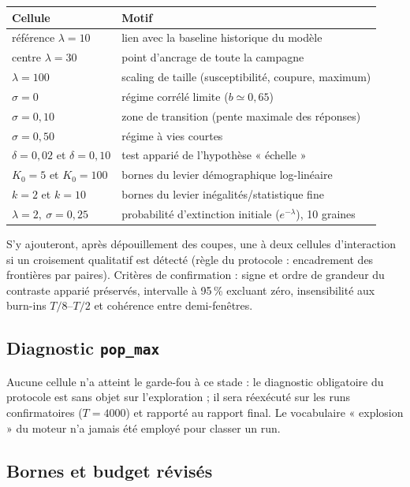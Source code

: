 \documentclass[11pt,a4paper]{article}
\newcommand{\code}[1]{\texttt{#1}}
\begin{document}
\begin{center}
\begin{tabularx}{\textwidth}{@{}lX@{}}
\toprule
Cellule & Motif \\
\midrule
référence $\lambda=10$ & lien avec la baseline historique du modèle \\
centre $\lambda=30$ & point d'ancrage de toute la campagne \\
$\lambda=100$ & scaling de taille (susceptibilité, coupure, maximum) \\
$\sigma=0$ & régime corrélé limite ($b\simeq0{,}65$) \\
$\sigma=0{,}10$ & zone de transition (pente maximale des réponses) \\
$\sigma=0{,}50$ & régime à vies courtes \\
$\delta=0{,}02$ et $\delta=0{,}10$ & test apparié de l'hypothèse
« échelle » \\
$K_0=5$ et $K_0=100$ & bornes du levier démographique log-linéaire \\
$k=2$ et $k=10$ & bornes du levier inégalités/statistique fine \\
$\lambda=2,\ \sigma=0{,}25$ & probabilité d'extinction initiale
($e^{-\lambda}$), 10 graines \\
\bottomrule
\end{tabularx}
\end{center}

S'y ajouteront, après dépouillement des coupes, une à deux cellules
d'interaction si un croisement qualitatif est détecté (règle du
protocole : encadrement des frontières par paires). Critères de
confirmation : signe et ordre de grandeur du contraste apparié
préservés, intervalle à 95\,\% excluant zéro, insensibilité aux burn-ins
$T/8$--$T/2$ et cohérence entre demi-fenêtres.

\subsection{Diagnostic \code{pop\_max}}

Aucune cellule n'a atteint le garde-fou à ce stade : le diagnostic
obligatoire du protocole est sans objet sur l'exploration ; il sera
réexécuté sur les runs confirmatoires ($T=4000$) et rapporté au rapport
final. Le vocabulaire « explosion » du moteur n'a jamais été employé
pour classer un run.

\subsection{Bornes et budget révisés}
\end{document}
